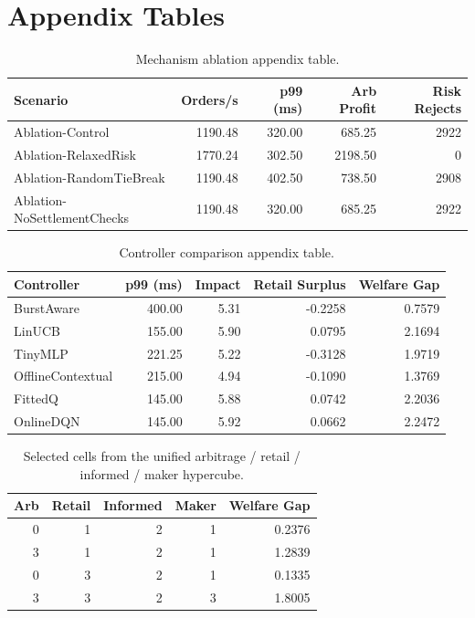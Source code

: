 \documentclass[11pt]{article}
\begin{document}
\section{Appendix Tables}
\begin{table}[h]
\centering
\begin{tabular}{lrrrr}
\toprule
Scenario & Orders/s & p99 (ms) & Arb Profit & Risk Rejects \\
\midrule
Ablation-Control & 1190.48 & 320.00 & 685.25 & 2922 \\
Ablation-RelaxedRisk & 1770.24 & 302.50 & 2198.50 & 0 \\
Ablation-RandomTieBreak & 1190.48 & 402.50 & 738.50 & 2908 \\
Ablation-NoSettlementChecks & 1190.48 & 320.00 & 685.25 & 2922 \\
\bottomrule
\end{tabular}
\caption{Mechanism ablation appendix table.}
\end{table}

\begin{table}[h]
\centering
\begin{tabular}{lrrrr}
\toprule
Controller & p99 (ms) & Impact & Retail Surplus & Welfare Gap \\
\midrule
BurstAware & 400.00 & 5.31 & -0.2258 & 0.7579 \\
LinUCB & 155.00 & 5.90 & 0.0795 & 2.1694 \\
TinyMLP & 221.25 & 5.22 & -0.3128 & 1.9719 \\
OfflineContextual & 215.00 & 4.94 & -0.1090 & 1.3769 \\
FittedQ & 145.00 & 5.88 & 0.0742 & 2.2036 \\
OnlineDQN & 145.00 & 5.92 & 0.0662 & 2.2472 \\
\bottomrule
\end{tabular}
\caption{Controller comparison appendix table.}
\end{table}

\begin{table}[h]
\centering
\begin{tabular}{rrrrr}
\toprule
Arb & Retail & Informed & Maker & Welfare Gap \\
\midrule
0 & 1 & 2 & 1 & 0.2376 \\
3 & 1 & 2 & 1 & 1.2839 \\
0 & 3 & 2 & 1 & 0.1335 \\
3 & 3 & 2 & 3 & 1.8005 \\
\bottomrule
\end{tabular}
\caption{Selected cells from the unified arbitrage / retail / informed / maker hypercube.}
\end{table}



\end{document}
